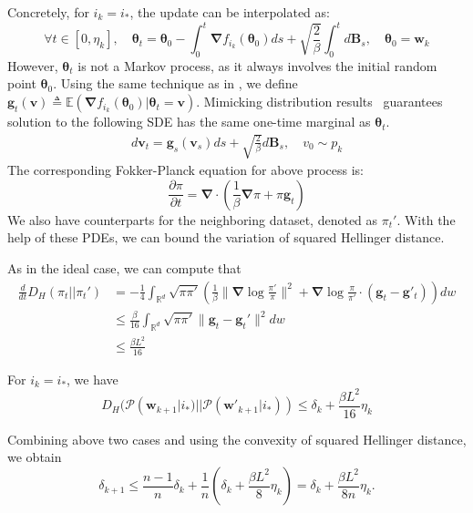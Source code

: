 \documentclass[final,12pt]{colt2018} %
\begin{document}
Concretely, for $i_k=i_*$, the update can be interpolated as:
\begin{equation}
\forall t\in[0,\eta_k],\quad\bm{\theta}_t=\bm{\theta}_0-\int_0^t \bm{\nabla} f_{i_k}(\bm{\theta}_0)ds+\sqrt{\frac{2}{\beta}}\int_0^td\bm{B}_s,\quad \bm{\theta}_0=\bm{w}_k
\end{equation}
However, $\bm{\theta}_t$ is not a Markov process, as it always involves the initial random point $\bm{\theta}_0$. Using the same technique as in \cite{raginsky2017non}, we define $\bm{g}_t(\bm{v})\triangleq\mathbb{E}\left(\bm{\nabla} f_{i_k}(\bm{\theta}_0)\Big| \bm{\theta}_t=\bm{v}\right)$. Mimicking distribution results~\citep{gyongy1986mimicking} guarantees solution to the following SDE has the same one-time marginal as $\bm{\theta}_t$.
\begin{equation}
\begin{split}
  d\bm{v}_t = \bm{g}_s(\bm{v}_s)ds+\sqrt{\frac{2}{\beta}}d\bm{B}_s,\quad v_0\sim p_k
  \end{split}
\end{equation}
The corresponding Fokker-Planck equation for above process is:
\begin{equation}
  \frac{\partial \pi}{\partial t}=\bm{\nabla}\cdot\left(\frac{1}{\beta} \bm{\nabla}\pi+\pi \bm{g}_t\right)
\end{equation}
We also have counterparts for the neighboring dataset, denoted as $\pi_t'$. With the help of these PDEs, we can bound the variation of squared Hellinger distance.

As in the ideal case, we can compute that
\begin{equation}
\begin{split}
\frac{d}{dt}D_{H}(\pi_t||\pi_t')&=-\frac{1}{4}\int_{\mathbb{R}^d}\sqrt{\pi \pi'}\left(\frac{1}{\beta}\|\bm{\nabla}\log\frac{\pi'}{\pi}\|^2+\bm{\nabla}\log\frac{\pi}{\pi'}\cdot(\bm{g}_t-\bm{g}'_t)\right)dw\\
&\le\frac{\beta}{16}\int_{\mathbb{R}^d}\sqrt{\pi \pi'}\|\bm{g}_t-\bm{g}_t'\|^2dw\\
&\le \frac{\beta L^2}{16}
\end{split}
\end{equation}

    For $i_k=i_*$, we have 
  \begin{equation}
  D_H(\mathcal{P}(\bm{w}_{k+1}|i_*)||\mathcal{P}(\bm{w}'_{k+1}|i_*))\leqslant \delta_k+\frac{\beta L^2}{16}\eta_k
  \end{equation}


Combining above two cases and using the convexity of squared Hellinger distance, we obtain
\begin{equation}
  \delta_{k+1}\le \frac{n-1}{n}\delta_k+ \frac{1}{n}(\delta_k+ \frac{\beta L^2}{8} \eta_k)=\delta_k+\frac{\beta L^2}{8n}\eta_k.
\end{equation}
\end{document}
